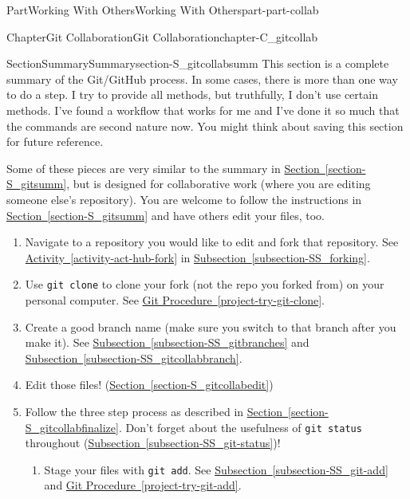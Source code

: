 \documentclass[oneside,10pt,]{book}
\newcommand{\xreffont}{\relax}
\newcommand{\mono}[1]{\texttt{#1}}
\begin{document}
\begin{partptx}{Part}{Working With Others}{}{Working With Others}{}{}{part-part-collab}
\begin{chapterptx}{Chapter}{Git Collaboration}{}{Git Collaboration}{}{}{chapter-C_gitcollab}
\typeout{************************************************}
%
\begin{sectionptx}{Section}{Summary}{}{Summary}{}{}{section-S_gitcollabsumm}
%
This section is a complete summary of the Git\slash{}GitHub process. In some cases, there is more than one way to do a step. I try to provide all methods, but truthfully, I don't use certain methods. I've found a workflow that works for me and I've done it so much that the commands are second nature now. You might think about saving this section for future reference.%
\par
Some of these pieces are very similar to the summary in \hyperref[section-S_gitsumm]{Section~{\xreffont\ref{section-S_gitsumm}}}, but is designed for collaborative work (where you are editing someone else's repository). You are welcome to follow the instructions in \hyperref[section-S_gitsumm]{Section~{\xreffont\ref{section-S_gitsumm}}} and have others edit your files, too.%
\begin{enumerate}
\item{}Navigate to a repository you would like to edit and fork that repository. See \hyperref[activity-act-hub-fork]{Activity~{\xreffont\ref{activity-act-hub-fork}}} in \hyperref[subsection-SS_forking]{Subsection~{\xreffont\ref{subsection-SS_forking}}}.%
\item{}Use \mono{git clone} to clone your fork (not the repo you forked from) on your personal computer. See \hyperref[project-try-git-clone]{Git Procedure~{\xreffont\ref{project-try-git-clone}}}.%
\item{}Create a good branch name (make sure you switch to that branch after you make it). See \hyperref[subsection-SS_gitbranches]{Subsection~{\xreffont\ref{subsection-SS_gitbranches}}} and \hyperref[subsection-SS_gitcollabbranch]{Subsection~{\xreffont\ref{subsection-SS_gitcollabbranch}}}.%
\item{}Edit those files! (\hyperref[section-S_gitcollabedit]{Section~{\xreffont\ref{section-S_gitcollabedit}}})%
\item{}Follow the three step process as described in \hyperref[section-S_gitcollabfinalize]{Section~{\xreffont\ref{section-S_gitcollabfinalize}}}. Don't forget about the usefulness of \mono{git status} throughout (\hyperref[subsection-SS_git-status]{Subsection~{\xreffont\ref{subsection-SS_git-status}}})!%
\begin{enumerate}
\item{}Stage your files with \mono{git add}. See \hyperref[subsection-SS_git-add]{Subsection~{\xreffont\ref{subsection-SS_git-add}}} and \hyperref[project-try-git-add]{Git Procedure~{\xreffont\ref{project-try-git-add}}}.%

\end{enumerate}
\end{enumerate}
\end{sectionptx}
\end{chapterptx}
\end{partptx}
\end{document}

